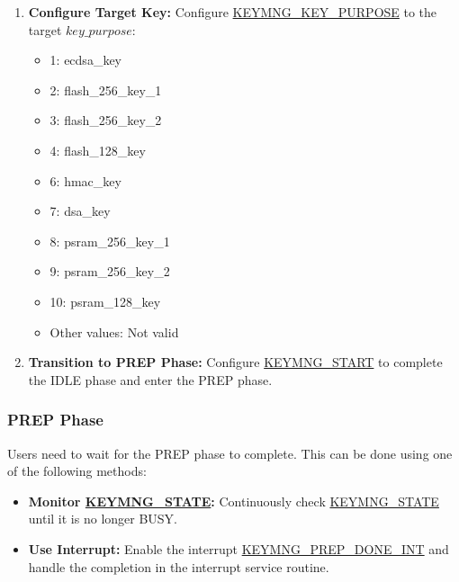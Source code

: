 \documentclass[main\_\_EN.tex]{subfiles}
\begin{document}
\begin{enumerate}
\begin{itemize}
        \item Others: Not valid
    \end{itemize}
    \label{sec:keymng-key-purpose}
    \item \textbf{Configure Target Key:} Configure \hyperref[fielddesc:KEYMNGKEYPURPOSE]{KEYMNG\_KEY\_PURPOSE} to the target \begin{math}key\_purpose\end{math}:
    \begin{itemize}
        \item 1: ecdsa\_key
        \item 2: flash\_256\_key\_1
        \item 3: flash\_256\_key\_2
        \item 4: flash\_128\_key
        \item 6: hmac\_key
        \item 7: dsa\_key
        \item 8: psram\_256\_key\_1
        \item 9: psram\_256\_key\_2
        \item 10: psram\_128\_key
        \item Other values: Not valid
    \end{itemize}
    \item \textbf{Transition to PREP Phase:} Configure \hyperref[fielddesc:KEYMNGSTART]{KEYMNG\_START} to complete the IDLE phase and enter the PREP phase.
\end{enumerate}


\subsubsection{PREP Phase}

Users need to wait for the PREP phase to complete. This can be done using one of the following methods:
\begin{itemize}
    \item \textbf{Monitor \hyperref[fielddesc:KEYMNGSTATE]{KEYMNG\_STATE}:} Continuously check \hyperref[fielddesc:KEYMNGSTATE]{KEYMNG\_STATE} until it is no longer BUSY.
    \item \textbf{Use Interrupt:} Enable the interrupt \hyperref[int:KEYMNGPREPDONEINT]{KEYMNG\_PREP\_DONE\_INT} and handle the completion in the interrupt service routine.
\end{itemize}
\end{document}
